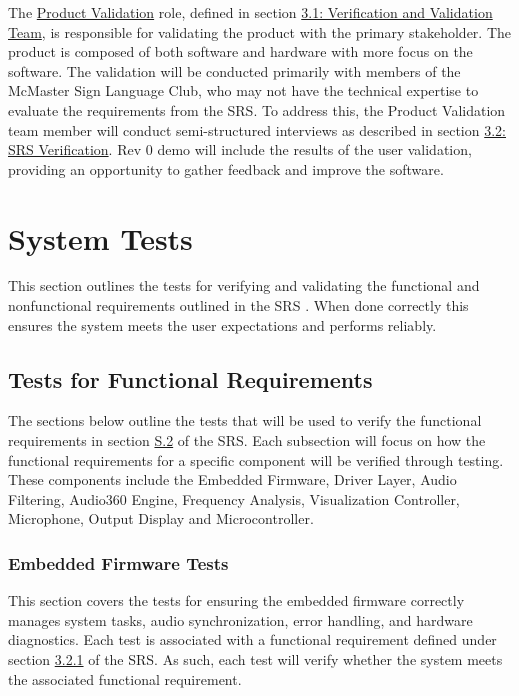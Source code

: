 \documentclass[12pt, titlepage]{article}
\begin{document}
The \hyperref[role:product_validation]{Product Validation} role, defined in
section \hyperref[sec:vnv_team]{3.1: Verification and Validation Team}, is
responsible for validating the product with the primary stakeholder. The product
is composed of both software and hardware with more focus on the software. The
validation will be conducted primarily with members of the McMaster Sign
Language Club, who may not have the technical expertise to evaluate the
requirements from the SRS. To address this, the Product Validation team member
will conduct semi-structured interviews as described in section
\hyperref[sec:srs_verification]{3.2: SRS Verification}. Rev 0 demo will include
the results of the user validation, providing an opportunity to gather feedback
and improve the software.

\section{System Tests} \label{sec:system_tests}

This section outlines the tests for verifying and validating the functional and
nonfunctional requirements outlined in the SRS \citep{SRS}. When done correctly
this ensures the system meets the user expectations and performs reliably. 

\subsection{Tests for Functional Requirements}

The sections below outline the tests that will be used to verify the functional
requirements in section \hyperref[SRS-sec:S.2]{S.2} of the SRS. Each subsection
will focus on how the functional requirements for a specific component will be
verified through testing. These components include the Embedded Firmware, Driver
Layer, Audio Filtering, Audio360 Engine, Frequency Analysis, Visualization
Controller, Microphone, Output Display and Microcontroller. 

\subsubsection{Embedded Firmware Tests}

This section covers the tests for ensuring the embedded firmware correctly
manages system tasks, audio synchronization, error handling, and hardware
diagnostics. Each test is associated with a functional requirement defined under
section \hyperref[SRS-sec:FR1]{3.2.1} of the SRS. As such, each test will verify
whether the system meets the associated functional requirement.
\end{document}
